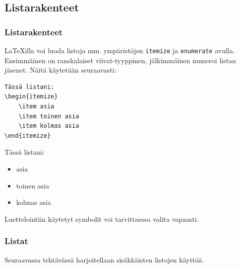 \subsection{Listarakenteet}
\begin{frame}[fragile]
    \frametitle{Listarakenteet}
    \LaTeX illa voi luoda listoja mm. ympäristöjen \verb-itemize- ja \verb-enumerate- avulla. Ensimmäinen on ranskalaiset viivat-tyyppinen, jälkimmäinen numeroi listan jäsenet. Näitä käytetään seuraavasti:
    \vaihto
    \begin{minipage}{4cm}
        \begin{scriptsize}
            \begin{Verbatim}[frame=single]
Tässä listani:
\begin{itemize}
    \item asia
    \item toinen asia
    \item kolmas asia
\end{itemize}
            \end{Verbatim}
        \end{scriptsize}
    \end{minipage}
    \begin{minipage}{4cm}
        Tässä listani:
        \begin{itemize}
            \item asia
            \item toinen asia
            \item kolmas asia
        \end{itemize}
    \end{minipage}
    \vaihto
    Luettelointiin käytetyt symbolit voi tarvittaessa valita vapaasti. 
\end{frame}
\begin{frame}[fragile]
    \frametitle{Listat}
    Seuraavassa tehtävässä harjoitellaan sisäkkäisten listojen käyttöä.
    
    
\end{frame}
